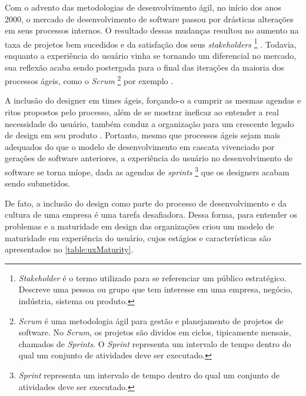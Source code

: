 Com o advento das metodologias de desenvolvimento ágil, no início dos anos 2000, o mercado de desenvolvimento de software passou por drásticas alterações em seus processos internos. O resultado dessas mudanças resultou no aumento na taxa de projetos bem sucedidos e da satisfação dos seus \textit{stakeholders} \footnote{\textit{Stakeholder} é o termo utilizado para se referenciar um público estratégico. Descreve uma pessoa ou grupo que tem interesse em uma empresa, negócio, indústria, sistema ou produto.} \cite{serrador2015does}. Todavia, enquanto a experiência do usuário vinha se tornando um diferencial no mercado, sua reflexão acaba sendo postergada para o final das iterações da maioria dos processos ágeis, como o \textit{Scrum} \footnote{\textit{Scrum} é uma metodologia ágil para gestão e planejamento de projetos de software. No \textit{Scrum}, os projetos são dividos em ciclos, tipicamente mensais, chamados de \textit{Sprints}. O \textit{Sprint} representa um intervalo de tempo dentro do qual um conjunto de atividades deve ser executado.} por exemplo \cite{ruissalo2018operating}.

A inclusão do designer em times ágeis, forçando-o a cumprir as mesmas agendas e ritos propostos pelo processo, além de se mostrar ineficaz ao entender a real necessidade do usuário, também conduz a organização para um crescente legado de design em seu produto \cite{ruissalo2018operating}. Portanto, mesmo que processos ágeis sejam mais adequados do que o modelo de desenvolvimento em cascata vivenciado por gerações de software anteriores, a experiência do usuário no desenvolvimento de software se torna míope, dada as agendas de \textit{sprints} \footnote{\textit{Sprint} representa um intervalo de tempo dentro do qual um conjunto de atividades deve ser executado.} que os designers acabam sendo submetidos.

De fato, a inclusão do design como parte do processo de desenvolvimento e da cultura de uma empresa é uma tarefa desafiadora. Dessa forma, para entender os problemas e a maturidade em design das organizações  criou um modelo de maturidade em experiência do usuário, cujos estágios e características são apresentados no \autoref{table:uxMaturity}.

